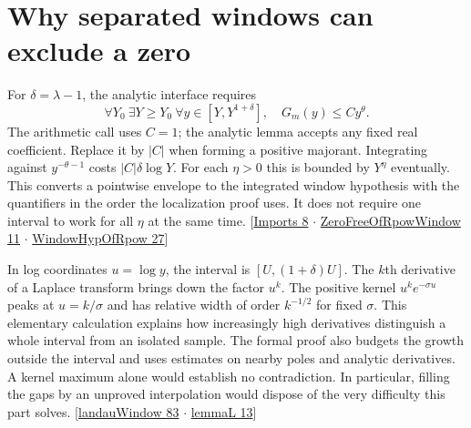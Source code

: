 \documentclass[12pt,letterpaper]{article}
\begin{document}
\section{Why separated windows can exclude a zero}
For $\delta=\lambda-1$, the analytic interface requires
\[
 \forall Y_0\ \exists Y\ge Y_0\ \forall y\in[Y,Y^{1+\delta}],
 \quad G_m(y)\le C y^\theta .
\]
The arithmetic call uses $C=1$; the analytic lemma accepts any fixed real coefficient. Replace it by $|C|$ when forming a positive majorant. Integrating against $y^{-\theta-1}$ costs $|C|\delta\log Y$. For each $\eta>0$ this is bounded by $Y^\eta$ eventually. This converts a pointwise envelope to the integrated window hypothesis with the quantifiers in the order the localization proof uses. It does not require one interval to work for all $\eta$ at the same time. {\small\sffamily\color{mute}[\href{https://github.com/nousentllc/riemann-hypothesis/blob/40e56bab026552e089d7afcfeff08d2defb9c005/src/Development/AutomorphicArithmetic/PrimitiveCosets/Imports.lean#L8}{Imports 8} $\cdot$ \href{https://github.com/nousentllc/riemann-hypothesis/blob/40e56bab026552e089d7afcfeff08d2defb9c005/src/Development/AutomorphicArithmetic/DedekindLFunctions/LandauTheorems/ZeroFreeOfRpowWindow.lean#L11}{ZeroFreeOfRpowWindow 11} $\cdot$ \href{https://github.com/nousentllc/riemann-hypothesis/blob/40e56bab026552e089d7afcfeff08d2defb9c005/src/Development/AutomorphicArithmetic/DedekindLFunctions/LandauTheorems/WindowHypOfRpow.lean#L27}{WindowHypOfRpow 27}]}

In log coordinates $u=\log y$, the interval is $[U,(1+\delta)U]$. The $k$th derivative of a Laplace transform brings down the factor $u^k$. The positive kernel $u^k e^{-\sigma u}$ peaks at $u=k/\sigma$ and has relative width of order $k^{-1/2}$ for fixed $\sigma$. This elementary calculation explains how increasingly high derivatives distinguish a whole interval from an isolated sample. The formal proof also budgets the growth outside the interval and uses estimates on nearby poles and analytic derivatives. A kernel maximum alone would establish no contradiction. In particular, filling the gaps by an unproved interpolation would dispose of the very difficulty this part solves. {\small\sffamily\color{mute}[\href{https://github.com/nousentllc/riemann-hypothesis/blob/40e56bab026552e089d7afcfeff08d2defb9c005/src/Development/AutomorphicArithmetic/DedekindLFunctions/LandauTheorems/landauWindow.lean#L83}{landauWindow 83} $\cdot$ \href{https://github.com/nousentllc/riemann-hypothesis/blob/40e56bab026552e089d7afcfeff08d2defb9c005/src/Development/AutomorphicArithmetic/DedekindLFunctions/LandauTheorems/lemmaL.lean#L13}{lemmaL 13}]}
\end{document}
